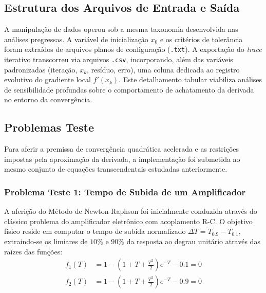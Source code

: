 \subsection{Estrutura dos Arquivos de Entrada e Saída}
\label{subsec:estrutura_arquivos_newton_raphson}

A manipulação de dados operou sob a mesma taxonomia desenvolvida nas análises pregressas. A variável de inicialização $x_0$ e os critérios de tolerância foram extraídos de arquivos planos de configuração (\texttt{.txt}). A exportação do \textit{trace} iterativo transcorreu via arquivos \texttt{.csv}, incorporando, além das variáveis padronizadas (iteração, $x_k$, resíduo, erro), uma coluna dedicada ao registro evolutivo do gradiente local $f'(x_k)$. Este detalhamento tabular viabiliza análises de sensibilidade profundas sobre o comportamento de achatamento da derivada no entorno da convergência.

\subsection{Problemas Teste}
\label{subsec:problemas_testes_newton_raphson}

Para aferir a premissa de convergência quadrática acelerada e as restrições impostas pela aproximação da derivada, a implementação foi submetida ao mesmo conjunto de equações transcendentais estudadas anteriormente.


\subsubsection{Problema Teste 1: Tempo de Subida de um Amplificador}
\label{subsubsec:problema_teste_1_newton_raphson}

A aferição do Método de Newton-Raphson foi inicialmente conduzida através do clássico problema do amplificador eletrônico com acoplamento R-C. O objetivo físico reside em computar o tempo de subida normalizado $\Delta T = T_{0.9} - T_{0.1}$, extraindo-se os limiares de $10\%$ e $90\%$ da resposta ao degrau unitário através das raízes das funções:
\begin{align}
    f_1(T) &= 1 - \left(1 + T + \frac{T^2}{2}\right)e^{-T} - 0.1 = 0 \label{eq:f1_newton} \\
    f_2(T) &= 1 - \left(1 + T + \frac{T^2}{2}\right)e^{-T} - 0.9 = 0 \label{eq:f2_newton}
\end{align}

